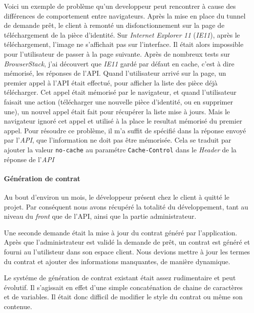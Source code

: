 Voici un exemple de problème qu'un developpeur peut rencontrer à cause
des différences de comportement entre navigateurs. Après la mise en
place du tunnel de demande prêt, le client à remonté un
disfonctionnement sur la page de téléchargement de la pièce d'identité.
Sur \emph{Internet Explorer 11} (\emph{IE11}), après le téléchargement,
l'image ne s'affichait pas sur l'interface. Il était alors impossible
pour l'utilisateur de passer à la page suivante. Après de nombreux tests
sur \emph{BrowserStack}, j'ai découvert que \emph{IE11} gardé par défaut
en cache, c'est à dire mémorisé, les réponses de l'API. Quand
l'utilisateur arrivé sur la page, un premier appel à l'API était
effectué, pour afficher la liste des pièce déjà télécharger. Cet appel
était mémorisé par le navigateur, et quand l'utilisateur faisait une
action (télécharger une nouvelle pièce d'identité, ou en supprimer une),
un nouvel appel était fait pour récupérer la liste mise à jours. Mais le
navigateur ignoré cet appel et utilisé à la place le resultat mémorisé
du premier appel. Pour résoudre ce problème, il m'a suffit de spécifié
dans la réponse envoyé par l'\emph{API}, que l'information ne doit pas
être mémorisée. Cela se traduit par ajouter la valeur \texttt{no-cache}
au paramétre \texttt{Cache-Control} dans le \emph{Header} de la réponse
de l'\emph{API}

\bigskip

\paragraph{Génération de contrat}\label{guxe9nuxe9ration-de-contrat}

Au bout d'environ un mois, le développeur présent chez le client à
quitté le projet. Par conséquent nous avons récupéré la totalité du
développement, tant au niveau du \emph{front} que de l'API, ainsi que la
partie administrateur.

\bigskip

Une seconde demande était la mise à jour du contrat généré par
l'application. Après que l'administrateur est validé la demande de prêt,
un contrat est généré et fourni au l'utilisteur dans son espace client.
Nous devions mettre à jour les termes du contrat et ajouter des
informations manquantes, de manière dynamique.

\bigskip

Le systéme de génération de contrat existant était assez rudimentaire et
peut évolutif. Il s'agissait en effet d'une simple concaténation de
chaine de caractères et de variables. Il était donc difficil de modifier
le style du contrat ou même son contenue.

